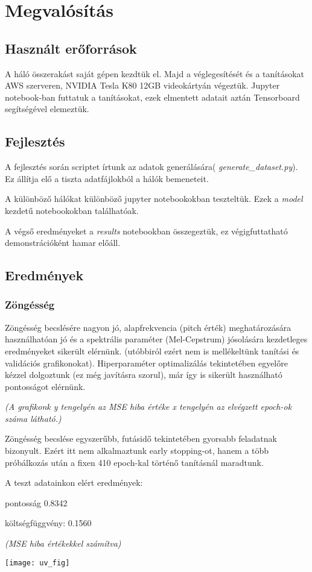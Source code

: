 \section{Megvalósítás}
\subsection{Használt erőforrások}
A háló összerakást saját gépen kezdtük el. Majd a véglegesítését és a tanításokat AWS szerveren, NVIDIA Tesla K80 12GB videokártyán végeztük. Jupyter notebook-ban futtatuk a tanításokat, ezek elmentett adatait aztán Tensorboard segítségével elemeztük.
\subsection{Fejlesztés}
A fejlesztés során scriptet írtunk az adatok generálására( {\it generate\_dataset.py}). Ez állítja elő a tiszta adatfájlokból a hálók bemeneteit.

A különböző hálókat különböző jupyter notebookokban teszteltük. Ezek a {\it model} kezdetű notebookokban találhatóak.

A végső eredményeket a {\it results} notebookban összegeztük, ez végigfuttatható demonstrációként hamar előáll. 
\subsection{Eredmények}
\subsubsection{Zöngésség}
Zöngésség becslésére nagyon jó, alapfrekvencia (pitch érték) meghatározására használhatóan jó és a spektrális paraméter (Mel-Cepstrum) jósolására kezdetleges eredményeket sikerült elérnünk. (utóbbiról ezért nem is mellékeltünk tanítási és validációs grafikonokat). Hiperparaméter optimalizálás tekintetében egyelőre kézzel dolgoztunk (ez még javításra szorul), már így is sikerült használható pontosságot  elérnünk.

\textit{(A grafikonk y tengelyén az MSE hiba értéke x tengelyén az elvégzett epoch-ok száma látható.)}

\begin{minipage}{0.5\textwidth}
	Zöngésség becslése egyszerűbb, futásidő tekintetében gyorsabb feladatnak bizonyult. Ezért itt nem alkalmaztunk early stopping-ot, hanem a több próbálkozás után a fixen 410 epoch-kal történő tanításnál maradtunk.
	
	A teszt adatainkon elért eredmények:
	
	pontosság 0.8342
	
	költségfüggvény: 0.1560
	
	\textit{(MSE hiba értékekkel számítva)}
\end{minipage}
\begin{minipage}{0.5\textwidth}
	\flushright	
	\texttt{[image: uv\_fig]}
\end{minipage}
